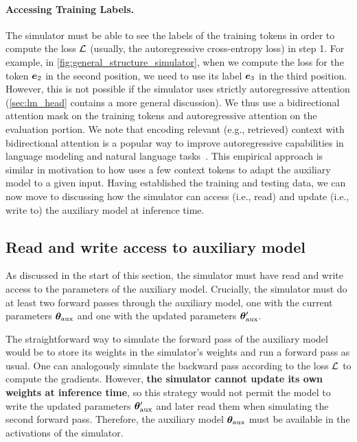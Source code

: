 \paragraph{Accessing Training Labels.} 
The simulator must be able to see the labels of the training tokens 
in order to compute the loss $\mathcal{L}$ (usually, the autoregressive cross-entropy loss) in step 1. 
For example, in \cref{fig:general_structure_simulator}, when we compute the loss for the token $\ve_2$ in the second position, we need to use its label $\ve_3$ in the third position.
However, this is not possible if the simulator uses strictly autoregressive attention (\cref{sec:lm_head} contains a more general discussion).
We thus use a bidirectional attention mask on the training tokens and autoregressive attention on the evaluation portion.
We note that encoding relevant (e.g., retrieved) context with bidirectional attention is a popular way to improve autoregressive capabilities in language modeling and natural language tasks~\citep{raffel2020exploring,borgeaud2022improving,izacard2020leveraging,izacard2023atlas,wang2023shall,tay2022ul2}.
This empirical approach is similar in motivation to how \simulator{} uses a few context tokens to adapt the auxiliary model to a given input.
Having established the training and testing data, we can now move to discussing how the simulator can access (i.e., read) and update (i.e., write to) the auxiliary model at inference time.  

\subsection{Read and write access to auxiliary model}
As discussed in the start of this section, the simulator must have read and write access to the parameters of the auxiliary model.
Crucially, the simulator must do at least two forward passes through the auxiliary model, one with the current parameters ${\bm{\theta}}_{\text{aux}}$ and one with the updated parameters ${\bm{\theta}}_{\text{aux}}'$.

The straightforward  way to simulate the forward pass of the auxiliary model would be to store its weights in the simulator's weights and run a forward pass as usual.
One can analogously simulate the backward pass according to the loss $\mathcal{L}$ to compute the gradients.
However, \textbf{the simulator cannot update its own weights at inference time}, so this strategy would not permit the model to write the updated parameters ${\bm{\theta}}_{\text{aux}}'$ and later read them when simulating the second forward pass.
Therefore, the auxiliary model ${\bm{\theta}}_{\text{aux}}$ must be available in the activations of the simulator. 

